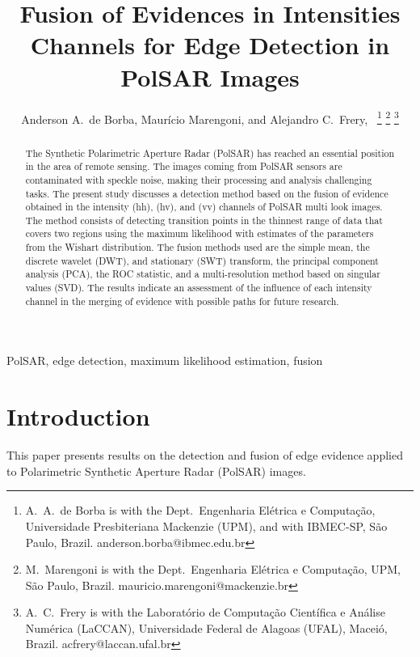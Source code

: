 \documentclass[journal]{IEEEtran}
\begin{document}
\title{Fusion of Evidences in Intensities Channels for Edge Detection in PolSAR Images}
\author{Anderson A.\ de Borba, Maurício Marengoni, and Alejandro C.\ Frery,~%
\thanks{A.\ A.\ de Borba is with the Dept.\ Engenharia Elétrica e Computação, Universidade Presbiteriana Mackenzie (UPM), and with IBMEC-SP, São Paulo, Brazil. anderson.borba@ibmec.edu.br}
\thanks{M.\ Marengoni is with the Dept.\ Engenharia Elétrica e Computação,
UPM, São Paulo, Brazil. mauricio.marengoni@mackenzie.br}
\thanks{A.\ C.\ Frery is with the Laboratório de Computação Científica e Análise Numérica (LaCCAN), Universidade Federal de Alagoas (UFAL), Maceió, Brazil. acfrery@laccan.ufal.br}}

\maketitle

\begin{abstract}
The Synthetic Polarimetric Aperture Radar (PolSAR) has reached an essential position in the area of remote sensing. The images coming from PolSAR sensors are contaminated with speckle noise, making their processing and analysis challenging tasks. The present study discusses a detection method based on the fusion of evidence obtained in the intensity (hh), (hv), and (vv) channels of PolSAR multi look images. The method consists of detecting transition points in the thinnest range of data that covers two regions using the maximum likelihood with estimates of the parameters from the Wishart distribution. The fusion methods used are the simple mean, the discrete wavelet (DWT), and stationary (SWT) transform, the principal component analysis (PCA), the ROC statistic, and a multi-resolution method based on singular values (SVD). The results indicate an assessment of the influence of each intensity channel in the merging of evidence with possible paths for future research.
\end{abstract}

\begin{IEEEkeywords}
PolSAR, edge detection, maximum likelihood estimation, fusion
\end{IEEEkeywords}

\section{Introduction}\label{sec_01}

This paper presents results on the detection and fusion of edge evidence applied to Polarimetric Synthetic Aperture Radar (PolSAR) images.
\end{document}
